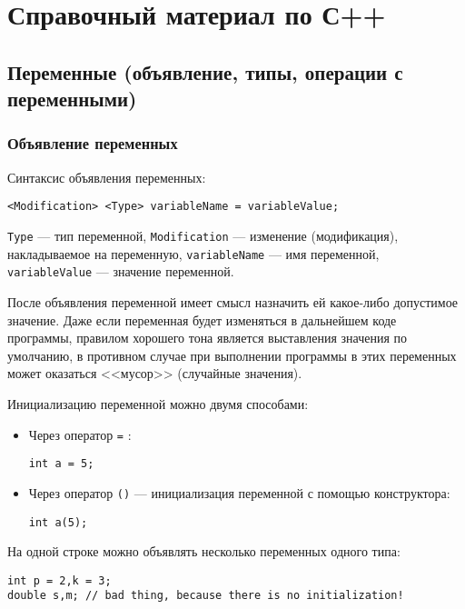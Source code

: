 \section{Справочный материал по С++}

\subsection{Переменные (объявление, типы, операции с переменными)}

\subsubsection{Объявление переменных}
Синтаксис объявления переменных:

\lstinline|<Modification> <Type> variableName = variableValue;|

\lstinline|Type| --- тип переменной, \lstinline|Modification| --- изменение (модификация), накладываемое на переменную, \lstinline|variableName| --- имя переменной, \lstinline|variableValue| --- значение переменной.

После объявления переменной имеет смысл назначить ей какое-либо допустимое значение. Даже если переменная будет изменяться в дальнейшем коде программы, правилом хорошего тона является выставления значения по умолчанию, в противном случае при выполнении программы в этих переменных может оказаться <<мусор>> (случайные значения).

Инициализацию переменной можно двумя способами:
\begin{itemize}
    \item Через оператор \lstinline{=} :

        \lstinline|int a = 5;|
    \item Через оператор \lstinline{()} --- инициализация переменной с помощью конструктора:

         \lstinline|int a(5);|
\end{itemize}

На одной строке можно объявлять несколько переменных одного типа:
\begin{lstlisting}
int p = 2,k = 3;
double s,m; // bad thing, because there is no initialization!
\end{lstlisting}

